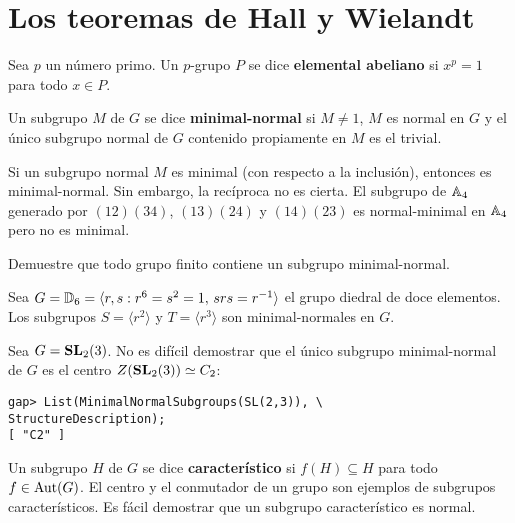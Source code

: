 \chapter{Los teoremas de Hall y Wielandt}

\begin{definition}
	Sea $p$ un número primo. Un $p$-grupo $P$ se dice \textbf{elemental
	abeliano} si $x^p=1$ para todo $x\in P$.
\end{definition}

\begin{definition}
	Un subgrupo $M$ de $G$ se dice \textbf{minimal-normal} si $M\ne1$,
	$M$ es normal en $G$ y el único subgrupo normal de $G$ contenido
	propiamente en $M$ es el trivial. 
\end{definition}

\begin{example}
	Si un subgrupo normal $M$ es minimal (con respecto a la inclusión),
	entonces es minimal-normal. Sin embargo, la recíproca no es cierta.  El
	subgrupo de $\mathbb{A}_4$ generado por $(12)(34)$, $(13)(24)$ y $(14)(23)$ es
	normal-minimal en $\mathbb{A}_4$ pero no es minimal. 
\end{example}

\begin{exercise}
	Demuestre que todo grupo finito contiene un subgrupo minimal-normal. 
\end{exercise}

\begin{example}
	Sea $G=\mathbb{D}_{6}=\langle r,s:r^6=s^2=1,\,srs=r^{-1}\rangle$ el grupo diedral
	de doce elementos. Los subgrupos $S=\langle r^2\rangle$ 
	y $T=\langle r^3\rangle$ son minimal-normales en $G$.
\end{example}

\begin{example}
	Sea $G=\mathbf{SL}_2(3)$. No es difícil demostrar que el único subgrupo
	minimal-normal de $G$ es el centro $Z(\mathbf{SL}_2(3))\simeq C_2$:
\begin{lstlisting}
gap> List(MinimalNormalSubgroups(SL(2,3)), \
StructureDescription);
[ "C2" ]
\end{lstlisting}
\end{example}

Un subgrupo $H$ de $G$ se dice \textbf{característico} si 
$f(H)\subseteq H$ para todo $f\in\operatorname{Aut}(G)$. 
El centro y el conmutador de un grupo son ejemplos de subgrupos característicos. 
Es fácil demostrar que
un subgrupo característico es normal.  

